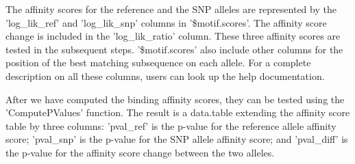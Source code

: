 \documentclass[a4paper,10pt]{article}
\begin{document}
\begin{Schunk}
\end{Schunk}

The affinity scores for the reference and the SNP alleles are represented by the 'log\_lik\_ref' and 'log\_lik\_snp' columns in '\$motif.scores'. The affinity score change is included in the 'log\_lik\_ratio' column. These three affinity scores are tested in the subsequent steps. '\$motif.scores' also include other columns for the position of the best matching subsequence on each allele. For a complete description on all these columns, users can look up the help documentation.

After we have computed the binding affinity scores, they can be tested using the 'ComputePValues' function. The result is a data.table extending the affinity score table by three columns: 'pval\_ref' is the p-value for the reference allele affinity score; 'pval\_snp' is the p-value for the SNP allele affinity score; and 'pval\_diff' is the p-value for the affinity score change between the two alleles.
\end{document}
